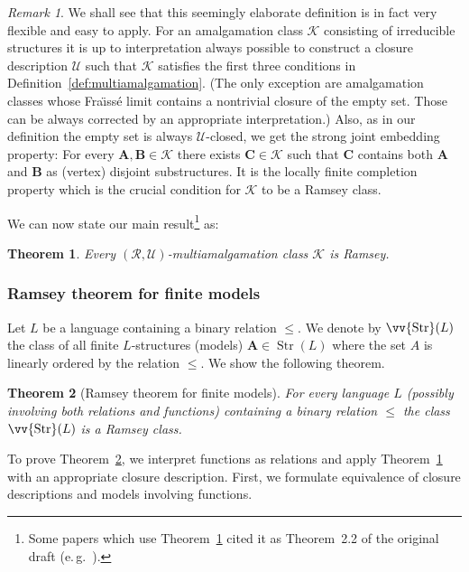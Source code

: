 \documentclass{elsarticle}
\newcommand{\eg}{e.\,g.}
\def\Str{\mathop{\mathrm{Str}}\nolimits}
\def\ordclass#1{\vv{#1}}
\def\str#1{\mathbf {#1}}
\def\K{{\mathcal K}}
\def\Fraisse{Fra\"{\i}ss\' e}
\theoremstyle{plain}
\newtheorem{theorem}{Theorem}[section]
\theoremstyle{definition}
\theoremstyle{remark}
\newtheorem*{remark}{Remark}
\begin{document}
\begin{remark}
We shall see that this seemingly elaborate definition is in fact very flexible and easy to apply.
For an amalgamation class $\mathcal K$ consisting of irreducible structures it is up to interpretation always possible to construct a
closure description $\mathcal U$ such that $\mathcal K$ satisfies the first three conditions in Definition~\ref{def:multiamalgamation}. (The only exception are amalgamation classes whose \Fraisse{} limit contains a nontrivial closure of the empty set. Those can be always corrected by an appropriate interpretation.) Also, as in our definition the empty set is always $\mathcal{U}$-closed, we get the strong joint embedding property: For every $\str{A}, \str{B}\in \K$ there exists $\str{C}\in \K$ such that $\str{C}$ contains both $\str{A}$ and $\str{B}$ as (vertex) disjoint substructures.
It is the locally finite completion property which is the crucial condition for
$\K$ to be a Ramsey class. 
\end{remark}

We can now state our main result\footnote{Some papers which use Theorem~\ref{thm:mainstrongclosures} cited it as Theorem~2.2 of the original draft (\eg~\cite{Evans2}).} as:
\begin{theorem}
\label{thm:mainstrongclosures}
Every $(\mathcal R,\mathcal U)$-multiamalgamation class $\K$ is Ramsey.
\end{theorem}

\subsubsection{Ramsey theorem for finite models}
\label{sec:functions}
Let $L$ be a language containing a binary relation $\leq$. We denote by $\ordclass{\Str}(L)$ the class of all finite $L$-structures (models) $\str{A}\in\Str(L)$ where the set $A$ is linearly ordered by the relation $\leq$.  We show the following theorem.
\begin{theorem}[Ramsey theorem for finite models]
\label{thm:models}
For every language $L$ (possibly involving both relations and functions) containing a binary relation $\leq$ the class $\ordclass{\Str}(L)$ is a Ramsey class.
\end{theorem}
To prove Theorem~\ref{thm:models}, we interpret functions as relations and apply
Theorem~\ref{thm:mainstrongclosures} with an appropriate closure description.
First, we formulate equivalence of closure descriptions and models involving functions.
\end{document}
